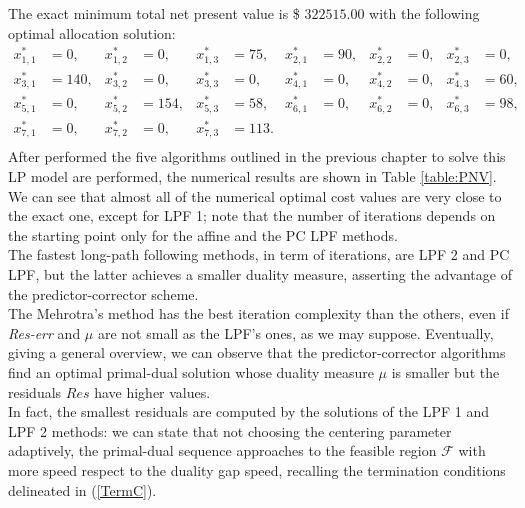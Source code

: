 \documentclass[a4paper,10 pt,titlepage,twoside]{book}
\theoremstyle{plain}
\theoremstyle{definition}
\theoremstyle{remark}
\begin{document}
The exact minimum total net present value is \$ $322515.00$ with the following optimal allocation solution:
\begin{align*}
x_{1,1}^{*} &=  0, & x_{1,2}^{*}&= 0, & x_{1,3}^{*} &= 75, & x_{2,1}^{*} &= 90, & x_{2,2}^{*} &= 0, & x_{2,3}^{*} &= 0,\\
x_{3,1}^{*} &= 140, & x_{3,2}^{*}&= 0, & x_{3,3}^{*} &= 0, & x_{4,1}^{*} &= 0, & x_{4,2}^{*} &= 0, & x_{4,3}^{*} &= 60,\\
x_{5,1}^{*} &= 0, & x_{5,2}^{*}&= 154, & x_{5,3}^{*} &= 58, & x_{6,1}^{*} &= 0, & x_{6,2}^{*} &= 0, & x_{6,3}^{*} &= 98,\\
 x_{7,1}^{*}&= 0,&x_{7,2}^{*} &= 0, & x_{7,3}^{*} &= 113. & & & &  & & \\
\end{align*}
After performed the five algorithms outlined in the previous chapter to solve this LP model are performed, the numerical results are shown in Table \ref{table:PNV}.\\ 
We can see that almost all of the numerical optimal cost values are very close to the exact one, except for LPF 1; note that the number of iterations depends on the starting point only for the affine and the PC LPF methods.\\
The fastest long-path following methods, in term of iterations, are LPF 2 and PC LPF, but the latter achieves a smaller duality measure, asserting the advantage of the predictor-corrector scheme.\\
The Mehrotra's method has the best iteration complexity than the others, even if \textit{Res-err} and $\mu$ are not small as the LPF's ones, as we may suppose. 
Eventually, giving a general overview, we can observe that the predictor-corrector algorithms find an optimal primal-dual solution whose duality measure $\mu$ is smaller but the residuals $Res$ have higher values.\\
In fact, the smallest residuals are computed by the solutions of the LPF 1 and LPF 2 methods: we can state that not choosing the centering parameter adaptively, the primal-dual sequence approaches to the feasible region $\mathcal{F}$ with more speed respect to the duality gap speed, recalling the termination conditions delineated in (\ref{TermC}).\\
\end{document}
